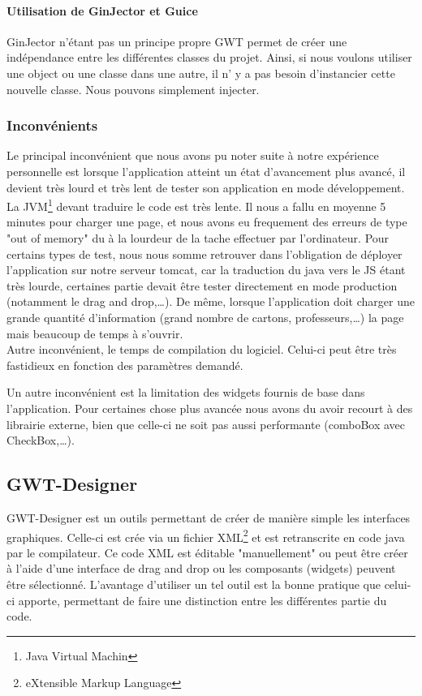 \paragraph{Utilisation de GinJector et Guice}
GinJector n'étant pas un principe propre GWT permet de créer une indépendance entre les différentes classes du projet. Ainsi, si nous voulons utiliser une object ou une classe dans une autre, il n' y a pas besoin d'instancier cette nouvelle classe. Nous pouvons simplement injecter.

\subsubsection{Inconvénients}
Le principal inconvénient que nous avons pu noter suite à notre expérience personnelle est lorsque l'application atteint un état d'avancement plus avancé, il devient très lourd et très lent de tester son application en mode développement. La JVM\footnote{Java Virtual Machin} devant traduire le code est très lente. Il nous a fallu en moyenne 5 minutes pour charger une page, et nous avons eu frequement des erreurs de type "out of memory" du à la lourdeur de la tache effectuer par l'ordinateur. Pour certains types de test, nous nous somme retrouver dans l'obligation de déployer l'application sur notre serveur tomcat, car la traduction du java vers le JS étant très lourde, certaines partie devait être tester directement en mode production (notamment le drag and drop,…). De même, lorsque l'application doit charger une grande quantité d'information (grand nombre de cartons, professeurs,…) la page mais beaucoup de temps à s'ouvrir.\\
Autre inconvénient, le temps de compilation du logiciel. Celui-ci peut être très fastidieux en fonction des paramètres demandé.
	
Un autre inconvénient est la limitation des widgets fournis de base dans l'application. Pour certaines chose plus avancée nous avons du avoir recourt à des librairie externe, bien que celle-ci ne soit pas aussi performante (comboBox avec CheckBox,…).

\subsection{GWT-Designer}
GWT-Designer est un outils permettant de créer de manière simple les interfaces graphiques. Celle-ci est crée via un fichier XML\footnote{eXtensible Markup Language} et est retranscrite en code java par le compilateur. Ce code XML est éditable "manuellement" ou peut être créer à l'aide d'une interface de drag and drop ou les composants (widgets) peuvent être sélectionné. L'avantage d'utiliser un tel outil est la bonne pratique que celui-ci apporte, permettant de faire une distinction entre les différentes partie du code.

